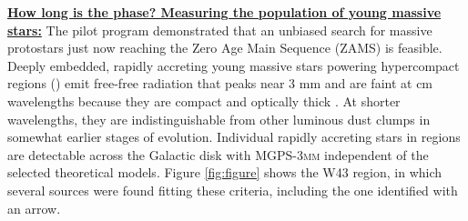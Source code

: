 \documentclass[11pt,preprint]{aastex_nofoot}
\newcommand{\MUSTANG}{\textsc{MUSTANG-2}\xspace}
\newcommand{\MGPS}{\textsc{MGPS-3mm}\xspace}
\begin{document}
% 
% 




\underline{\textbf{\helv How long is the \hchii phase?  Measuring the population of young massive stars:}}
The pilot program demonstrated that an unbiased search for massive protostars
just now reaching the Zero Age Main Sequence (ZAMS) is feasible.  Deeply
embedded, rapidly accreting young massive stars powering hypercompact \hii
regions (\hchii) emit free-free radiation that peaks near 3 mm and are faint at
cm wavelengths because they are compact and optically thick \citep[e.g.,
G20.08N][]{Galvan-Madrid2009a}.  At shorter wavelengths, they are
indistinguishable from other luminous dust clumps in somewhat earlier stages of
evolution.  Individual rapidly accreting stars in \hchii regions are
detectable across the Galactic disk with \MGPS independent of the selected
theoretical models.  Figure \ref{fig:figure} shows the W43 region, in which
several sources were found fitting these criteria, including the one identified
with an arrow.
\end{document}
